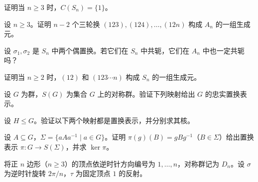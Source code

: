 \newpage
\noindent\begin{minipage}{\textwidth}
证明当 $n\ge3$ 时，$C(S_n)=\{1\}$。
\end{minipage}\par\vfill
\noindent\begin{minipage}{\textwidth}
设 $n\ge3$。证明 $n-2$ 个三轮换 $(123),(124),\ldots,(12n)$ 构成 $A_n$ 的一组生成元。
\end{minipage}\par\vfill
\noindent\begin{minipage}{\textwidth}
设 $\sigma_1,\sigma_2$ 是 $S_n$ 中两个偶置换。若它们在 $S_n$ 中共轭，它们在 $A_n$ 中也一定共轭吗？
\end{minipage}\par\vfill
\newpage
\noindent\begin{minipage}{\textwidth}
证明当 $n\ge2$ 时，$(12)$ 和 $(123\cdots n)$ 构成 $S_n$ 的一组生成元。
\end{minipage}\par\vfill
\noindent\begin{minipage}{\textwidth}
设 $G$ 为群，$S(G)$ 为集合 $G$ 上的对称群。验证下列映射给出 $G$ 的忠实置换表示。
\end{minipage}\par\vfill
\noindent\begin{minipage}{\textwidth}
设 $H\le G$。验证以下两个映射都是置换表示，并分别求其核。
\end{minipage}\par\vfill
\newpage
\noindent\begin{minipage}{\textwidth}
设 $A\subseteq G$，$\Sigma=\{aAa^{-1}\mid a\in G\}$。证明 $\pi(g)(B)=gBg^{-1}$（$B\in\Sigma$）给出置换表示 $\pi:G\to S(\Sigma)$，并求 $\ker\pi$。
\end{minipage}\par\vfill
\noindent\begin{minipage}{\textwidth}
将正 $n$ 边形（$n\ge3$）的顶点依逆时针方向编号为 $1,\ldots,n$，对称群记为 $D_n$。设 $\sigma$ 为逆时针旋转 $2\pi/n$，$\tau$ 为固定顶点 $1$ 的反射。
\end{minipage}\par\vfill
